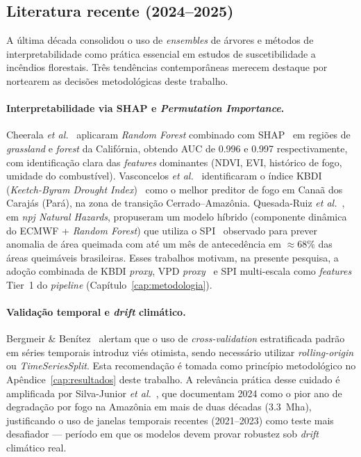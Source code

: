 \documentclass[tcc2]{uftex}
\begin{document}
\subsection{Literatura recente (2024--2025)}

A última década consolidou o uso de \emph{ensembles} de árvores e métodos de interpretabilidade como prática essencial em estudos de suscetibilidade a incêndios florestais. Três tendências contemporâneas merecem destaque por nortearem as decisões metodológicas deste trabalho.

\paragraph{Interpretabilidade via SHAP e \emph{Permutation Importance}.} Cheerala \emph{et al.}~\cite{cheerala2025probabilistic} aplicaram \emph{Random Forest} combinado com SHAP~\cite{lundberg2017unified} em regiões de \emph{grassland} e \emph{forest} da Califórnia, obtendo AUC de \num{0,996} e \num{0,997} respectivamente, com identificação clara das \emph{features} dominantes (NDVI, EVI, histórico de fogo, umidade do combustível). Vasconcelos \emph{et al.}~\cite{forests2024cerradoamazon} identificaram o índice KBDI (\emph{Keetch-Byram Drought Index})~\cite{keetch1968drought} como o melhor preditor de fogo em Canaã dos Carajás (Pará), na zona de transição Cerrado--Amazônia. Quesada-Ruiz \emph{et al.}~\cite{npjhazards2025fire}, em \emph{npj Natural Hazards}, propuseram um modelo híbrido (componente dinâmica do ECMWF + \emph{Random Forest}) que utiliza o SPI~\cite{mckee1993spi} observado para prever anomalia de área queimada com até um mês de antecedência em \(\approx 68\%\) das áreas queimáveis brasileiras. Esses trabalhos motivam, na presente pesquisa, a adoção combinada de KBDI \emph{proxy}, VPD \emph{proxy}~\cite{seager2015climatology} e SPI multi-escala como \emph{features} Tier~1 do \emph{pipeline} (Capítulo~\ref{cap:metodologia}).

\paragraph{Validação temporal e \emph{drift} climático.} Bergmeir \& Benítez~\cite{bergmeir2012cv} alertam que o uso de \emph{cross-validation} estratificada padrão em séries temporais introduz viés otimista, sendo necessário utilizar \emph{rolling-origin} ou \emph{TimeSeriesSplit}. Esta recomendação é tomada como princípio metodológico no Apêndice~\ref{cap:resultados} deste trabalho. A relevância prática desse cuidado é amplificada por Silva-Junior \emph{et al.}~\cite{silvajunior2025amazon}, que documentam 2024 como o pior ano de degradação por fogo na Amazônia em mais de duas décadas (\SI{3,3}{\mega\hectare}), justificando o uso de janelas temporais recentes (2021--2023) como teste mais desafiador --- período em que os modelos devem provar robustez sob \emph{drift} climático real.
\end{document}
